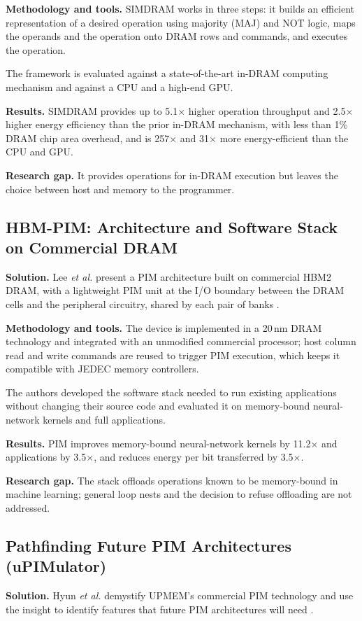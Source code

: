\documentclass{ieeeaccess}
\begin{document}
\textbf{Methodology and tools.} SIMDRAM works in three steps: it builds an efficient representation of a desired operation using majority (MAJ) and NOT logic, maps the operands and the operation onto DRAM rows and commands, and executes the operation.

The framework is evaluated against a state-of-the-art in-DRAM computing mechanism and against a CPU and a high-end GPU.

\textbf{Results.} SIMDRAM provides up to 5.1$\times$ higher operation throughput and 2.5$\times$ higher energy efficiency than the prior in-DRAM mechanism, with less than 1\% DRAM chip area overhead, and is 257$\times$ and 31$\times$ more energy-efficient than the CPU and GPU.

\textbf{Research gap.} It provides operations for in-DRAM execution but leaves the choice between host and memory to the programmer.

\subsection{HBM-PIM: Architecture and Software Stack on Commercial DRAM}
\textbf{Solution.} Lee \emph{et al.} present a PIM architecture built on commercial HBM2 DRAM, with a lightweight PIM unit at the I/O boundary between the DRAM cells and the peripheral circuitry, shared by each pair of banks \cite{lee2021hbmpim}.

\textbf{Methodology and tools.} The device is implemented in a 20\,nm DRAM technology and integrated with an unmodified commercial processor; host column read and write commands are reused to trigger PIM execution, which keeps it compatible with JEDEC memory controllers.

The authors developed the software stack needed to run existing applications without changing their source code and evaluated it on memory-bound neural-network kernels and full applications.

\textbf{Results.} PIM improves memory-bound neural-network kernels by 11.2$\times$ and applications by 3.5$\times$, and reduces energy per bit transferred by 3.5$\times$.

\textbf{Research gap.} The stack offloads operations known to be memory-bound in machine learning; general loop nests and the decision to refuse offloading are not addressed.

\subsection{Pathfinding Future PIM Architectures (uPIMulator)}
\textbf{Solution.} Hyun \emph{et al.} demystify UPMEM's commercial PIM technology and use the insight to identify features that future PIM architectures will need \cite{hyun2024pathfinding}.
\end{document}
